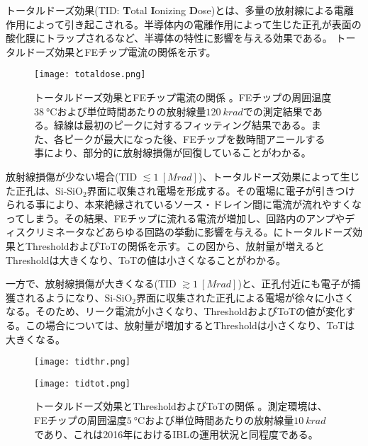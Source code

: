 トータルドーズ効果(TID: \textbf{T}otal \textbf{I}onizing \textbf{D}ose)とは、多量の放射線による電離作用によって引き起こされる。半導体内の電離作用によって生じた正孔が表面の酸化膜にトラップされるなど、半導体の特性に影響を与える効果である。
トータルドーズ効果とFEチップ電流の関係を示す。

\begin{figure}[tbp]
  \centering
  \texttt{[image: totaldose.png]}
  \caption[トータルドーズ効果とFEチップ電流の関係]{トータルドーズ効果とFEチップ電流の関係 \cite{tid}。FEチップの周囲温度$38\ \si{\degreeCelsius}$および単位時間あたりの放射線量$120\ \si{krad}$での測定結果である。緑線は最初のピークに対するフィッティング結果である。また、各ピークが最大になった後、FEチップを数時間アニールする事により、部分的に放射線損傷が回復していることがわかる。}
  \label{fig:totaldoze}
\end{figure}

放射線損傷が少ない場合(TID $\lesssim 1\ [\si{Mrad}]$)、トータルドーズ効果によって生じた正孔は、Si-SiO$_{2}$界面に収集され電場を形成する。その電場に電子が引きつけられる事により、本来絶縁されているソース・ドレイン間に電流が流れやすくなってしまう。その結果、FEチップに流れる電流が増加し、回路内のアンプやディスクリミネータなどあらゆる回路の挙動に影響を与える。にトータルドーズ効果とThresholdおよびToTの関係を示す。この図から、放射量が増えるとThresholdは大きくなり、ToTの値は小さくなることがわかる。

一方で、放射線損傷が大きくなる(TID $\gtrsim 1\ [\si{Mrad}]$)と、正孔付近にも電子が捕獲されるようになり、Si-SiO$_{2}$界面に収集された正孔による電場が徐々に小さくなる。そのため、リーク電流が小さくなり、ThresholdおよびToTの値が変化する。この場合については、放射量が増加するとThresholdは小さくなり、ToTは大きくなる。

\begin{figure}[tbp]
  \begin{minipage}[b]{0.5\linewidth}
    \centering
    \texttt{[image: tidthr.png]}
  \end{minipage}
  \begin{minipage}[b]{0.5\linewidth}
    \centering
    \texttt{[image: tidtot.png]}
  \end{minipage}
  \caption[トータルドーズ効果とThresholdおよびToTの関係]{トータルドーズ効果とThresholdおよびToTの関係 \cite{tid}。測定環境は、FEチップの周囲温度$5\ \si{\degreeCelsius}$および単位時間あたりの放射線量$10\ \si{krad}$であり、これは2016年におけるIBLの運用状況と同程度である。}
  \label{fig:tidhennka}
\end{figure}




